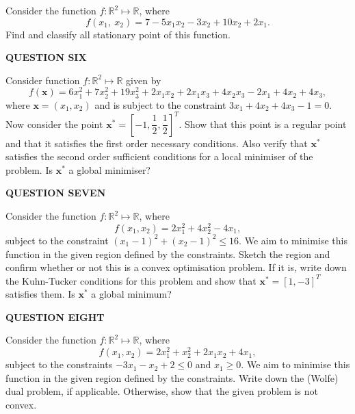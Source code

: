 \documentclass[11pt]{article}
\begin{document}
    \normalsize Consider the function $f: \mathbb{R}^2\mapsto \mathbb{R}$, where $$f(x_1,~x_2)=7-5x_1x_2-3x_2+10x_2+2x_1.$$ Find and classify all stationary point of this function.

    \vspace{20pt}
    
    \Large \textbf{QUESTION SIX}

    \vspace{5pt}

    \normalsize Consider function $f : \mathbb{R}^2 \mapsto \mathbb{R}$ given by $$f(\boldsymbol{x}) =6x_1^2+7x_2^2+19x_3^2+2x_1x_2+2x_1x_3+4x_2x_3-2x_1+4x_2+4x_3,$$where $\boldsymbol{x} = (x_1, x_2)$ and is subject to the constraint $3x_1+4x_2+4x_3-1=0.$ Now consider the point $\boldsymbol{x}^* = \left[-1, \dfrac{1}{2}, \dfrac{1}{2}\right]^T$. Show that this point is a regular point and that it satisfies the first order necessary conditions. Also verify that $\boldsymbol{x}^*$ satisfies the second order sufficient conditions for a local minimiser of the problem. Is $\boldsymbol{x}^*$ a global minimiser?

    \vspace{20pt}
    
    \Large \textbf{QUESTION SEVEN}

    \vspace{5pt}

    \normalsize Consider the function $f: \mathbb{R}^2\mapsto \mathbb{R}$, where $$f(x_1, x_2)=2x_1^2+4x_2^2-4x_1,$$ subject to the constraint $(x_1 - 1)^2+(x_2 - 1)^2\leq 16$. We aim to minimise this function in the given region defined by the constraints. Sketch the region and confirm whether or not this is a convex optimisation problem. If it is, write down the Kuhn-Tucker conditions for this problem and show that $\boldsymbol{x}^*=\left[1, -3\right]^T$ satisfies them. Is $\boldsymbol{x}^*$ a global minimum?

    \vspace{20pt}
    
    \Large \textbf{QUESTION EIGHT}

    \vspace{5pt}

    \normalsize Consider the function $f: \mathbb{R}^2\mapsto \mathbb{R}$, where $$f(x_1, x_2)=2x_1^2+x_2^2+2x_1x_2+4x_1,$$ subject to the constraints $-3x_1-x_2+2\leq0$ and $x_1 \geq 0$. We aim to minimise this function in the given region defined by the constraints. Write down the (Wolfe) dual problem, if applicable. Otherwise, show that the given problem is not convex.
\end{document}
